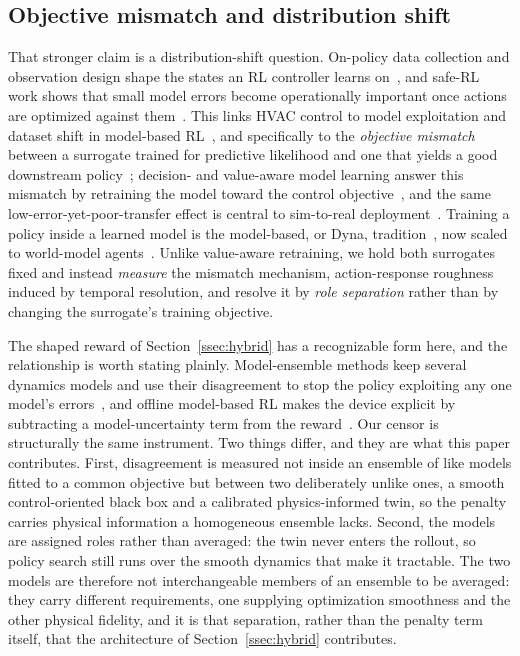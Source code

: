 \documentclass[energies,article,submit,moreauthors]{Definitions/mdpi}
\begin{document}
\subsection{Objective mismatch and distribution shift}
That stronger claim is a distribution-shift question. On-policy data collection and observation
design shape the states an RL controller learns
on~\cite{Mayor2025Parallelized,Radac2025OnlineRL,Gao2024Predictive}, and safe-RL work shows that
small model errors become operationally important once actions are optimized against
them~\cite{Garcia2015SafeRL,Wang2025SafeDRL}. This links HVAC control to model exploitation and
dataset shift in model-based RL~\cite{Quinonero2009DatasetShift,RiahiSamani2026OOD}, and
specifically to the \emph{objective mismatch} between a surrogate trained for predictive likelihood
and one that yields a good downstream policy~\cite{Lambert2020ObjectiveMismatch,Janner2019MBPO};
decision- and value-aware model learning answer this mismatch by retraining the model toward the
control objective~\cite{Farahmand2017VAML}, and the same low-error-yet-poor-transfer effect is
central to sim-to-real deployment~\cite{Zhao2020Sim2Real}. Training a policy inside a learned model
is the model-based, or Dyna, tradition~\cite{Sutton1991Dyna}, now scaled to world-model
agents~\cite{Hafner2025Dreamer}. Unlike value-aware retraining, we hold both surrogates fixed and
instead \emph{measure} the mismatch mechanism, action-response roughness induced by temporal
resolution, and resolve it by \emph{role separation} rather than by changing the surrogate's
training objective.

The shaped reward of Section~\ref{ssec:hybrid} has a recognizable form here, and the relationship
is worth stating plainly. Model-ensemble methods keep several dynamics models and use their
disagreement to stop the policy exploiting any one model's errors~\cite{Kurutach2018METRPO}, and
offline model-based RL makes the device explicit by subtracting a model-uncertainty term from the
reward~\cite{Yu2020MOPO}. Our censor is structurally the same instrument. Two things differ, and
they are what this paper contributes. First, disagreement is measured not inside an ensemble of like
models fitted to a common objective but between two deliberately unlike ones, a smooth
control-oriented black box and a calibrated physics-informed twin, so the penalty carries physical
information a homogeneous ensemble lacks. Second, the models are assigned roles rather than
averaged: the twin never enters the rollout, so policy search still runs over the smooth dynamics
that make it tractable. The two models are therefore not interchangeable members of an ensemble to
be averaged: they carry different requirements, one supplying optimization smoothness and the other
physical fidelity, and it is that separation, rather than the penalty term itself, that the
architecture of Section~\ref{ssec:hybrid} contributes.
\end{document}
